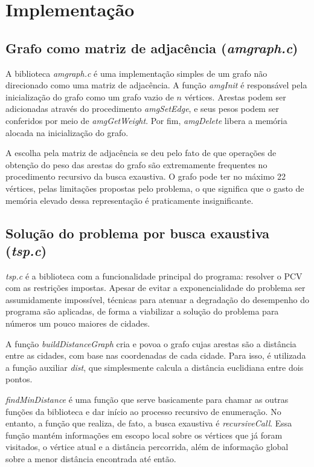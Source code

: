 \documentclass[10pt,a4paper]{article}
\numberwithin{equation}{section}
\begin{document}
\section{Implementação}

\subsection{Grafo como matriz de adjacência (\emph{amgraph.c})}

A biblioteca \emph{amgraph.c} é uma implementação simples de um grafo não direcionado como uma matriz de adjacência. A função \emph{amgInit} é responsável pela inicialização do grafo como um grafo vazio de $n$ vértices. Arestas podem ser adicionadas através do procedimento \emph{amgSetEdge}, e seus pesos podem ser conferidos por meio de \emph{amgGetWeight}. Por fim, \emph{amgDelete} libera a memória alocada na inicialização do grafo.

A escolha pela matriz de adjacência se deu pelo fato de que operações de obtenção do peso das arestas do grafo são extremamente frequentes no procedimento recursivo da busca exaustiva. O grafo pode ter no máximo 22 vértices, pelas limitações propostas pelo problema, o que significa que o gasto de memória elevado dessa representação é praticamente insignificante.

\subsection{Solução do problema por busca exaustiva (\emph{tsp.c})}

\emph{tsp.c} é a biblioteca com a funcionalidade principal do programa: resolver o PCV com as restrições impostas. Apesar de evitar a exponencialidade do problema ser assumidamente impossível, técnicas para atenuar a degradação do desempenho do programa são aplicadas, de forma a viabilizar a solução do problema para números um pouco maiores de cidades.

A função \emph{buildDistanceGraph} cria e povoa o grafo cujas arestas são a distância entre as cidades, com base nas coordenadas de cada cidade. Para isso, é utilizada a função auxiliar \emph{dist}, que simplesmente calcula a distância euclidiana entre dois pontos.

\emph{findMinDistance} é uma função que serve basicamente para chamar as outras funções da biblioteca e dar início ao processo recursivo de enumeração. No entanto, a função que realiza, de fato, a busca exaustiva é \emph{recursiveCall}. Essa função mantém informações em escopo local sobre os vértices que já foram visitados, o vértice atual e a distância percorrida, além de informação global sobre a menor distância encontrada até então.
\end{document}
